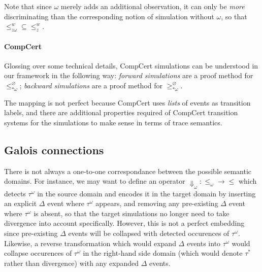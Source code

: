 \documentclass[11pt]{article}
\begin{document}
Note that since $\omega$ merely adds an additional observation,
it can only be \emph{more} discriminating than
the corresponding notion of simulation without $\omega$,
so that ${\le^w_{z \omega}} \subseteq {\le^w_z}$.


\paragraph{CompCert} %

Glossing over some technical details,
CompCert simulations can be understood in our framework
in the following way:
\emph{forward simulations}
are a proof method for $\le^\varnothing_{*\omega}$;
\emph{backward simulations}
are a proof method for $\ge^\varnothing_{*\omega}$.

The mapping is not perfect because
CompCert uses \emph{lists} of events as transition labels,
and there are additional properties
required of CompCert transition systems
for the simulations to make sense
in terms of trace semantics.



\subsection{Galois connections} %

There is not always a one-to-one correspondance between
the possible semantic domains.
For instance,
we may want to define an operator ${\Downarrow}_\omega : {\le_\omega} \rightarrow {\le}$
which detects $\tau^\omega$ in the source domain
and encodes it in the target domain
by inserting an explicit $\Delta$ event where $\tau^\omega$ appears,
and removing any pre-existing $\Delta$ event where $\tau^\omega$ is absent,
so that the target simulations no longer need to take
divergence into account specifically.
However,
this is not a perfect embedding
since pre-existing $\Delta$ events
will be collapsed with
detected occurences of $\tau^\omega$.
Likewise,
a reverse transformation which would expand $\Delta$ events into $\tau^\omega$
would collapse
occurences of $\tau^\omega$ in the right-hand side domain
(which would denote $\tau^*$ rather than divergence)
with any expanded $\Delta$ events.
\end{document}
